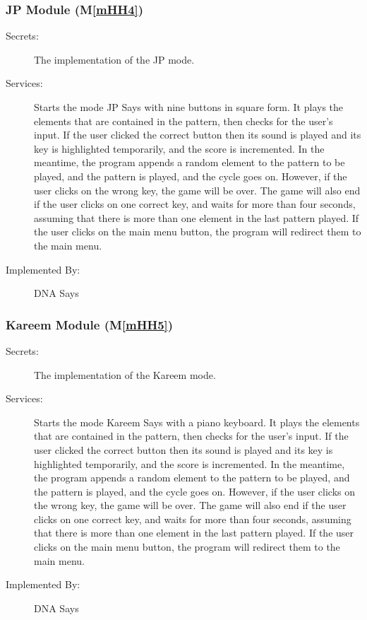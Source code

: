 \documentclass[12pt, titlepage]{article}
\newcommand{\mref}[1]{M\ref{#1}}
\begin{document}
\subsubsection{JP Module (\mref{mHH4})}
\begin{description}
\item[Secrets:] The implementation of the JP mode.
\item[Services:]Starts the mode JP Says with nine buttons in square form. It plays the elements that are contained in the pattern, then checks for the user's input. If the user clicked the correct button then its sound is played and its key is highlighted temporarily, and the score is incremented. In the meantime, the program appends a random element to the pattern to be played, and the pattern is played, and the cycle goes on. However, if the user clicks on the wrong key, the game will be over. The game will also end if the user clicks on one correct key, and waits for more than four seconds, assuming that there is more than one element in the last pattern played. If the user clicks on the main menu button, the program will redirect them to the main menu. 
\item[Implemented By:] DNA Says
\end{description}

\subsubsection{Kareem Module (\mref{mHH5})}
\begin{description}
\item[Secrets:] The implementation of the Kareem mode.
\item[Services:]Starts the mode Kareem Says with a piano keyboard. It plays the elements that are contained in the pattern, then checks for the user's input. If the user clicked the correct button then its sound is played and its key is highlighted temporarily, and the score is incremented. In the meantime, the program appends a random element to the pattern to be played, and the pattern is played, and the cycle goes on. However, if the user clicks on the wrong key, the game will be over. The game will also end if the user clicks on one correct key, and waits for more than four seconds, assuming that there is more than one element in the last pattern played. If the user clicks on the main menu button, the program will redirect them to the main menu.
\item[Implemented By:] DNA Says
\end{description}
\end{document}
